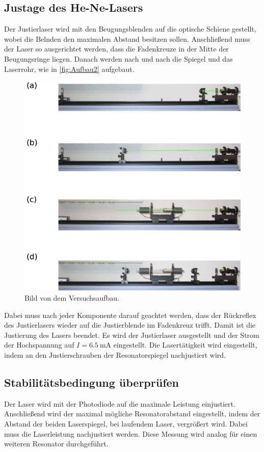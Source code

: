 \subsection{Justage des He-Ne-Lasers}
\label{subsec:Justage}
Der Justierlaser wird mit den Beugungsblenden auf die optische Schiene gestellt, wobei die Belnden den maximalen Abstand besitzen sollen.
Anschließend muss der Laser so ausgerichtet werden, dass die Fadenkreuze in der Mitte der Beugungsringe liegen.
Danach werden nach und nach die Spiegel und das Laserrohr, wie in \autoref{fig:Aufbau2} aufgebaut.
\begin{figure}[H]
    \centering
    \includegraphics[scale=0.7]{Abbildungen/Aufbau2.png}
    \caption{Bild von dem Versuchsaufbau.\cite{V61}}
    \label{fig:Aufbau2}
\end{figure}
Dabei muss nach jeder Komponente darauf geachtet werden, dass der Rückreflex des Justierlasers wieder auf die Justierblende im Fadenkreuz trifft.
Damit ist die Justierung des Lasers beendet. Es wird der Justierlaser ausgestellt und der Strom der Hochspannung
auf $I = \qty{6.5}{\milli\A}$ eingestellt. Die Lasertätigkeit wird eingestellt, indem an den Justierschrauben der Resonatorspiegel nachjustiert wird.

\subsection{Stabilitätsbedingung überprüfen}
\label{subsec:Stabilitätsbedingung}
Der Laser wird mit der Photodiode auf die maximale Leistung einjustiert.
Anschließend wird der maximal mögliche Resonatorabstand eingestellt, indem der Abstand der beiden Laserspiegel, bei laufendem Laser, vergrößert wird.
Dabei muss die Laserleistung nachjustiert werden.
Diese Messung wird analog für einen weiteren Resonator durchgeführt.

